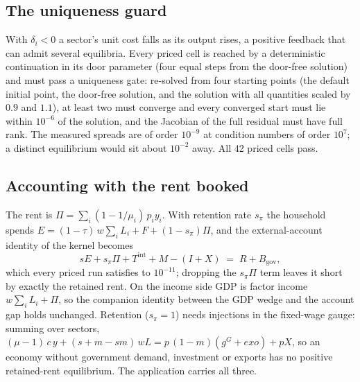 \subsection{The uniqueness guard}\label{app:pricing-guard}
With $\delta_i < 0$ a sector's unit cost falls as its output rises, a positive
feedback that can admit several equilibria. Every priced cell is reached by a
deterministic continuation in its door parameter (four equal steps from the
door-free solution) and must pass a uniqueness gate: re-solved from four
starting points (the default initial point, the door-free solution, and the
solution with all quantities scaled by $0.9$ and $1.1$), at least two must
converge and every converged start must lie within $10^{-6}$ of the solution,
and the Jacobian of the full residual must have full rank. The measured
spreads are of order $10^{-9}$ at condition numbers of order $10^{7}$; a
distinct equilibrium would sit about $10^{-2}$ away. All 42 priced cells pass.

\subsection{Accounting with the rent booked}\label{app:pricing-accounting}
The rent is $\Pi = \sum_i (1 - 1/\mu_i)\,p_i y_i$. With retention rate
$s_\pi$ the household spends
$E = (1-\tau)\,w\textstyle\sum_i L_i + F + (1-s_\pi)\Pi$, and the
external-account identity of the kernel becomes
\begin{equation}\label{eq:app-account}
  sE + s_\pi \Pi + T^{\mathrm{int}} + M - (I + X) \;=\; R + B_{\mathrm{gov}},
\end{equation}
which every priced run satisfies to $10^{-11}$; dropping the $s_\pi\Pi$ term
leaves it short by exactly the retained rent. On the income side GDP is factor
income $w\sum_i L_i + \Pi$, so the companion identity between the GDP wedge and
the account gap holds unchanged. Retention ($s_\pi = 1$) needs injections in
the fixed-wage gauge: summing over sectors,
$(\mu - 1)\,c\,y + (s + m - s m)\,w L = p\,(1-m)(g^G + \mathit{exo}) + pX$, so an
economy without government demand, investment or exports has no positive
retained-rent equilibrium. The application carries all three.
